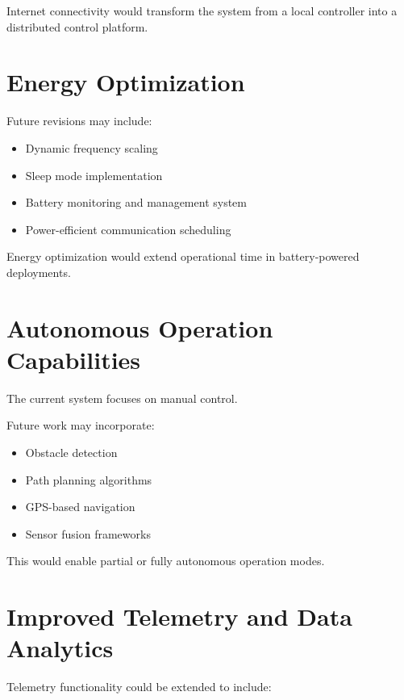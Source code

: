 Internet connectivity would transform the system from a local controller into a distributed control platform.


\section{Energy Optimization}

Future revisions may include:

\begin{itemize}
	\item Dynamic frequency scaling
	\item Sleep mode implementation
	\item Battery monitoring and management system
	\item Power-efficient communication scheduling
\end{itemize}

Energy optimization would extend operational time in battery-powered deployments.


\section{Autonomous Operation Capabilities}

The current system focuses on manual control. 

Future work may incorporate:

\begin{itemize}
	\item Obstacle detection
	\item Path planning algorithms
	\item GPS-based navigation
	\item Sensor fusion frameworks
\end{itemize}

This would enable partial or fully autonomous operation modes.


\section{Improved Telemetry and Data Analytics}

Telemetry functionality could be extended to include:

